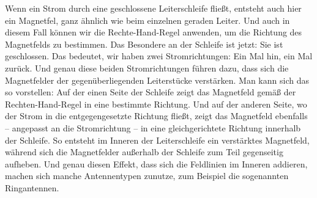 \begin{frame}
{	Wenn ein Strom durch eine geschlossene Leiterschleife fließt, entsteht auch hier ein Magnetfel, ganz ähnlich wie beim einzelnen geraden Leiter.
	Und auch in diesem Fall können wir die Rechte-Hand-Regel anwenden, um die Richtung des Magnetfelds zu bestimmen.
	Das Besondere an der Schleife ist jetzt: Sie ist geschlossen.
	Das bedeutet, wir haben zwei Stromrichtungen: Ein Mal hin, ein Mal zurück.
	Und genau diese beiden Stromrichtungen führen dazu, dass sich die Magnetfelder der gegenüberliegenden Leiterstücke verstärken.
	Man kann sich das so vorstellen: Auf der einen Seite der Schleife zeigt das Magnetfeld gemäß der Rechten-Hand-Regel in eine bestimmte Richtung.
	Und auf der anderen Seite, wo der Strom in die entgegengesetzte Richtung fließt, zeigt das Magnetfeld ebenfalls – angepasst an die Stromrichtung – in eine gleichgerichtete Richtung innerhalb der Schleife.
	So entsteht im Inneren der Leiterschleife ein verstärktes Magnetfeld, während sich die Magnetfelder außerhalb der Schleife zum Teil gegenseitig aufheben.
	Und genau diesen Effekt, dass sich die Feldlinien im Inneren addieren, machen sich manche Antennentypen zunutze, zum Beispiel die sogenannten Ringantennen.
}
\end{frame}

